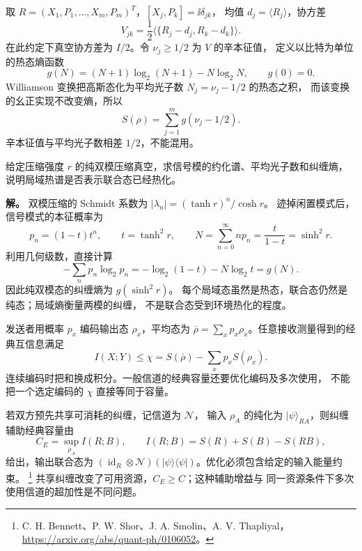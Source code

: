 \begin{definition}[高斯态的协方差与熵]
取 $R=(X_1,P_1,\dots,X_m,P_m)^T$，$[X_j,P_k]=\ii\delta_{jk}$，
均值 $d_j=\langle R_j\rangle$，协方差
\[
V_{jk}=\frac12\langle\{R_j-d_j,R_k-d_k\}\rangle.
\]
在此约定下真空协方差为 $I/2$。令 $\nu_j\ge1/2$ 为 $V$ 的辛本征值，
定义以比特为单位的热态熵函数
\[
g(N)=(N+1)\log_2(N+1)-N\log_2N,\qquad g(0)=0.
\]
Williamson 变换把高斯态化为平均光子数 $N_j=\nu_j-1/2$ 的热态之积，
而该变换的幺正实现不改变熵，所以
\[
S(\rho)=\sum_{j=1}^m g(\nu_j-1/2).
\]
辛本征值与平均光子数相差 $1/2$，不能混用。
\end{definition}

\begin{example}[双模压缩的约化热态与纠缠熵]
给定压缩强度 $r$ 的纯双模压缩真空，求信号模的约化谱、平均光子数和纠缠熵，说明局域热谱是否表示联合态已经热化。

\textbf{解。} 双模压缩的 Schmidt 系数为 $|\lambda_n|=(\tanh r)^n/\cosh r$。
迹掉闲置模式后，信号模式的本征概率为
\[
p_n=(1-t)t^n,\qquad t=\tanh^2r,
\qquad N=\sum_{n=0}^{\infty}np_n=\frac{t}{1-t}=\sinh^2r.
\]
利用几何级数，直接计算
\[
-\sum_n p_n\log_2p_n
=-\log_2(1-t)-N\log_2t=g(N).
\]
因此纯双模态的纠缠熵为 $g(\sinh^2r)$。
每个局域态虽然是热态，联合态仍然是纯态；局域熵衡量两模的纠缠，
不是联合态受到环境热化的程度。
\end{example}

\begin{definition}
发送者用概率 $p_x$ 编码输出态 $\rho_x$，平均态为
$\overline\rho=\sum_xp_x\rho_x$。任意接收测量得到的经典互信息满足
\[
I(X;Y)\le\chi=S(\overline\rho)-\sum_xp_xS(\rho_x).
\]
连续编码时把和换成积分。一般信道的经典容量还要优化编码及多次使用，
不能把一个选定编码的 $\chi$ 直接等同于容量。

若双方预先共享可消耗的纠缠，记信道为 $\mathcal N$，
输入 $\rho_A$ 的纯化为 $|\psi\rangle_{RA}$，则纠缠辅助经典容量由
\[
C_E=\sup_{\rho_A}I(R;B),\qquad
I(R;B)=S(R)+S(B)-S(RB),
\]
给出，输出联合态为 $(\operatorname{id}_R\otimes\mathcal N)
(|\psi\rangle\langle\psi|)$。优化必须包含给定的输入能量约束。
\footnote{C. H. Bennett、P. W. Shor、J. A. Smolin、A. V. Thapliyal，
\url{https://arxiv.org/abs/quant-ph/0106052}。}
共享纠缠改变了可用资源，$C_E\ge C$；这种辅助增益与
同一资源条件下多次使用信道的超加性是不同问题。
\end{definition}

